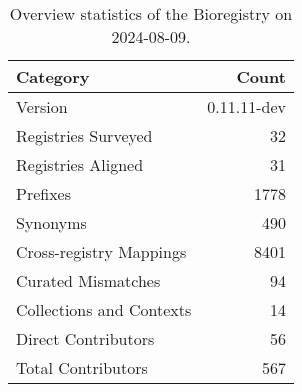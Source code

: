 \begin{table}
\caption{Overview statistics of the Bioregistry on 2024-08-09.}
\label{tab:bioregistry-summary}
\begin{tabular}{lr}
\toprule
Category & Count \\
\midrule
Version & 0.11.11-dev \\
Registries Surveyed & 32 \\
Registries Aligned & 31 \\
Prefixes & 1778 \\
Synonyms & 490 \\
Cross-registry Mappings & 8401 \\
Curated Mismatches & 94 \\
Collections and Contexts & 14 \\
Direct Contributors & 56 \\
Total Contributors & 567 \\
\bottomrule
\end{tabular}
\end{table}
